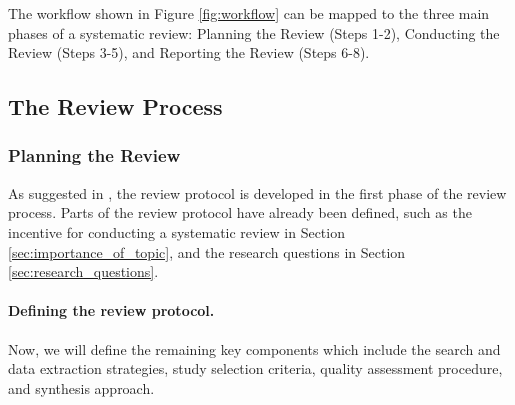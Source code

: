 The workflow shown in Figure \ref{fig:workflow} can be mapped to the three main phases of a
systematic review: Planning the Review (Steps 1-2), Conducting the Review (Steps 3-5), and
Reporting the Review (Steps 6-8).


\subsection{The Review Process}

\subsubsection{Planning the Review}
As suggested in \cite{keele_systematic_2007}, the review protocol is developed in the first phase
of the review process. Parts of the review protocol have already been defined, such as the
incentive for conducting a systematic review in Section \ref{sec:importance_of_topic}, and the
research questions in Section \ref{sec:research_questions}.

\paragraph{Defining the review protocol.}
Now, we will define the remaining key components which include the search and data extraction
strategies, study selection criteria, quality assessment procedure, and synthesis approach.

